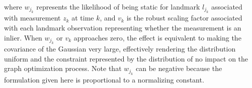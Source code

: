 where $w_{j_k}$ represents the likelihood of being static for landmark $l_{j_k}$ associated with measurement $z_k$ at time $k$, and $v_k$ is the robust scaling factor associated with each landmark observation representing whether the measurement is an inlier. When $w_{j_k}$ or $v_k$ approaches zero, the effect is equivalent to making the covariance of the Gaussian very large, effectively rendering the distribution uniform and the constraint represented by the distribution of no impact on the graph optimization process. Note that $w_{j_k}$ can be negative because the formulation given here is proportional to a normalizing constant.
